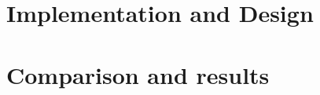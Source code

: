 \documentclass[a4paper,11 pt]{report}
\begin{document}
\chapter{Implementation and Design} %








\chapter{Comparison and results} 	%








%

\end{document}
